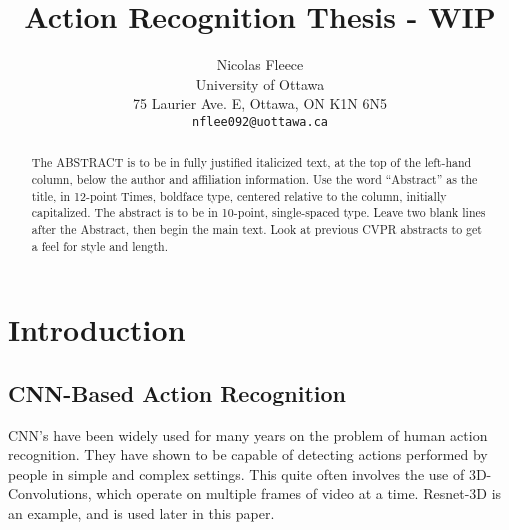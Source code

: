 \documentclass[10pt,twocolumn,letterpaper]{article}
\begin{document}
\title{Action Recognition Thesis - WIP}

\author{Nicolas Fleece\\
University of Ottawa\\
75 Laurier Ave. E, Ottawa, ON K1N 6N5\\
{\tt\small nflee092@uottawa.ca}
}
\maketitle

\begin{abstract}
   The ABSTRACT is to be in fully justified italicized text, at the top of the left-hand column, below the author and affiliation information.
   Use the word ``Abstract'' as the title, in 12-point Times, boldface type, centered relative to the column, initially capitalized.
   The abstract is to be in 10-point, single-spaced type.
   Leave two blank lines after the Abstract, then begin the main text.
   Look at previous CVPR abstracts to get a feel for style and length.
\end{abstract}

\section{Introduction}
\label{sec:intro}

\subsection{CNN-Based Action Recognition}

CNN's have been widely used for many years on the problem of human action recognition. They have shown to be capable of detecting actions performed by people in simple and complex settings. This quite often involves the use of 3D-Convolutions, which operate on multiple frames of video at a time. Resnet-3D is an example, and is used later in this paper.
\end{document}
